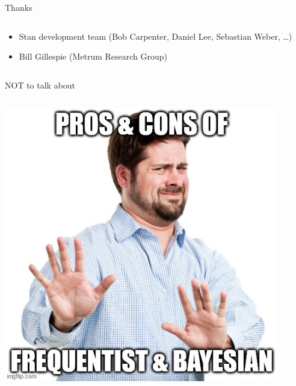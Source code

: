 \documentclass[bigger]{beamer}
\begin{document}
\begin{frame}[label={sec:org67665d2}]{Thanks}
\begin{columns}
\begin{column}{0.5\columnwidth}
\begin{itemize}
\item Stan development team (Bob Carpenter, Daniel Lee, Sebastian Weber, \ldots{})
\item Bill Gillespie (Metrum Research Group)
\end{itemize}
\end{column}
\end{columns}
\end{frame}




\begin{frame}[label={sec:org01490dc}]{NOT to talk about}
\begin{columns}
\begin{column}{0.33\columnwidth}
\begin{center}
\includegraphics[width=0.9\textwidth]{./figure/dont_want_2.jpg}
\end{center}
\end{column}



\end{columns}
\end{frame}
\end{document}
